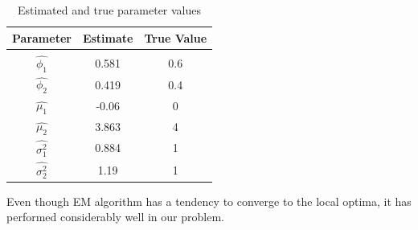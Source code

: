 \documentclass[11pt, a4paper]{article}\usepackage[]{graphicx}\usepackage[]{xcolor}
\begin{document}
\begin{table}[!htbp]
\def\arraystretch{1.5}

\centering
\begin{tabular}{ccc}
\hline
Parameter & Estimate & True Value \\[0.5em]
\hline \\[-0.8em]

$\widehat{\phi_1}$ 
& 0.581 
& 0.6 \\[1em]

$\widehat{\phi_2}$ 
& 0.419 
& 0.4 \\[1em]

$\widehat{\mu_1}$ 
& -0.06 
& 0 \\[1em]

$\widehat{\mu_2}$ 
& 3.863 
& 4 \\[1em]

$\widehat{\sigma_1^2}$ 
& 0.884 
& 1 \\[1em]

$\widehat{\sigma_2^2}$ 
& 1.19 
& 1 \\[0.5em]

\hline
\end{tabular}
\caption{Estimated and true parameter values}
\end{table}

\vspace{1cm}

{\fontsize{25}{20} } \hspace{0.1cm} {\fontsize{12}{20}\gloriahallelujahfont Even though EM algorithm has a tendency to converge to the local optima, it has performed considerably well in our problem.}
\end{document}
